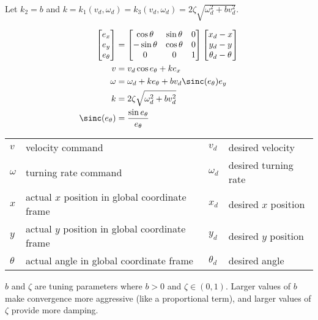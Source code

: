 Let $k_2 = b$ and
$k = k_1(v_d, \omega_d) = k_3(v_d, \omega_d) = 2\zeta\sqrt{\omega_d^2 + bv_d^2}$.
\begin{theorem}
  \begin{align}
    \begin{bmatrix}
      e_x \\
      e_y \\
      e_\theta
    \end{bmatrix} &=
    \begin{bmatrix}
      \cos\theta & \sin\theta & 0 \\
      -\sin\theta & \cos\theta & 0 \\
      0 & 0 & 1
    \end{bmatrix}
    \begin{bmatrix}
      x_d - x \\
      y_d - y \\
      \theta_d - \theta
    \end{bmatrix} \\
    v &= v_d \cos{e_\theta} + k e_x \\
    \omega &= \omega_d + k e_\theta + b v_d \sinc(e_\theta) e_y \\
    k &= 2\zeta\sqrt{\omega_d^2 + bv_d^2} \\
    \sinc(e_\theta) &= \frac{\sin{e_\theta}}{e_\theta}
  \end{align}
  \begin{figurekey}
    \begin{tabular}{llll}
      $v$ & velocity command & $v_d$ & desired velocity \\
      $\omega$ & turning rate command & $\omega_d$ & desired turning rate \\
      $x$ & actual $x$ position in global coordinate frame & $x_d$ &
        desired $x$ position \\
      $y$ & actual $y$ position in global coordinate frame & $y_d$ &
        desired $y$ position \\
      $\theta$ & actual angle in global coordinate frame & $\theta_d$ &
        desired angle
    \end{tabular}
  \end{figurekey}

  $b$ and $\zeta$ are tuning parameters where $b > 0$ and $\zeta \in (0, 1)$.
  Larger values of $b$ make convergence more aggressive (like a proportional
  term), and larger values of $\zeta$ provide more damping.
\end{theorem}

